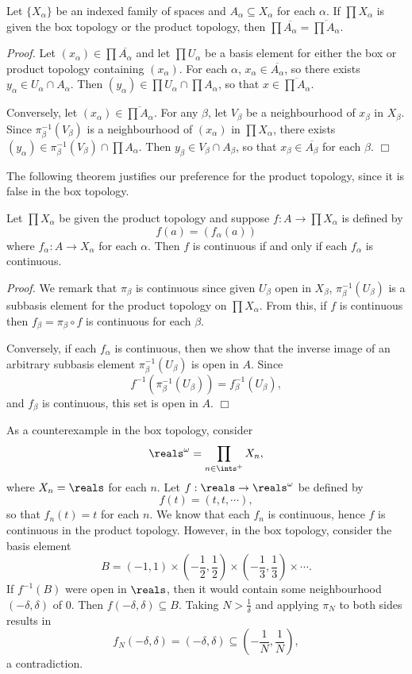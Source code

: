 \begin{theorem}\label{2.50}
    Let $\{X_\alpha\}$ be an indexed family of spaces and $A_\alpha \subseteq X_\alpha$ for each $\alpha$. If $\prod X_\alpha$ is given the box topology or the product topology, then $\prod \overline{A_\alpha} = \overline{\prod A_\alpha}$.
\end{theorem}
{\it Proof.} Let $(x_\alpha) \in \prod \overline{A_\alpha}$ and let $\prod U_\alpha$ be a basis element for either the box or product topology containing $(x_\alpha)$. For each $\alpha$, $x_\alpha \in \overline{A_\alpha}$, so there exists $y_\alpha \in U_\alpha \cap A_\alpha$. Then $(y_\alpha) \in \prod U_\alpha \cap \prod A_\alpha$, so that $x \in \overline{\prod A_\alpha}$.

Conversely, let $(x_\alpha) \in \overline{\prod A_\alpha}$. For any $\beta$, let $V_\beta$ be a neighbourhood of $x_\beta$ in $X_\beta$. Since $\pi_\beta^{-1}(V_\beta)$ is a neighbourhood of $(x_\alpha)$ in $\prod X_\alpha$, there exists $(y_\alpha) \in \pi_\beta^{-1}(V_\beta) \cap \prod A_\alpha$. Then $y_\beta \in V_\beta \cap A_\beta$, so that $x_\beta \in \overline{A_\beta}$ for each $\beta$. $\Box$

The following theorem justifies our preference for the product topology, since it is false in the box topology.
\begin{theorem}\label{2.51}
    Let $\prod X_\alpha$ be given the product topology and suppose $f: A \rightarrow \prod X_\alpha$ is defined by 
    $$f(a) = (f_\alpha(a))$$
    where $f_\alpha: A \rightarrow X_\alpha$ for each $\alpha$. Then $f$ is continuous if and only if each $f_\alpha$ is continuous.
\end{theorem}

{\it Proof.} We remark that $\pi_\beta$ is continuous since given $U_\beta$ open in $X_\beta$, $\pi_\beta^{-1}(U_\beta)$ is a subbasis element for the product topology on $\prod X_\alpha$. From this, if $f$ is continuous then $f_\beta = \pi_\beta \circ f$ is continuous for each $\beta$.

Conversely, if each $f_\alpha$ is continuous, then we show that the inverse image of an arbitrary subbasis element $\pi_\beta^{-1}(U_\beta)$ is open in $A$. Since
$$f^{-1}(\pi_\beta^{-1}(U_\beta)) = f_\beta^{-1}(U_\beta),$$
and $f_\beta$ is continuous, this set is open in $A$. $\Box$

As a counterexample in the box topology, consider 
$$\reals^\omega = \prod_{n \in \ints^+} X_n,$$
where $X_n = \reals$ for each $n$. Let $f: \reals \rightarrow \reals^\omega$ be defined by
$$f(t) = (t, t, \cdots),$$
so that $f_n(t) = t$ for each $n$. We know that each $f_n$ is continuous, hence $f$ is continuous in the product topology. However, in the box topology, consider the basis element
$$B = (-1, 1) \times (-\frac12 , \frac12) \times (-\frac13, \frac13) \times \cdots.$$
If $f^{-1}(B)$ were open in $\reals$, then it would contain some neighbourhood $(-\delta, \delta)$ of $0$. Then $f(-\delta, \delta) \subseteq B$. Taking $N > \frac{1}{\delta}$ and applying $\pi_N$ to both sides results in
$$f_N(-\delta, \delta) = (-\delta, \delta) \subseteq (-\frac{1}{N}, \frac{1}{N}),$$
a contradiction.

